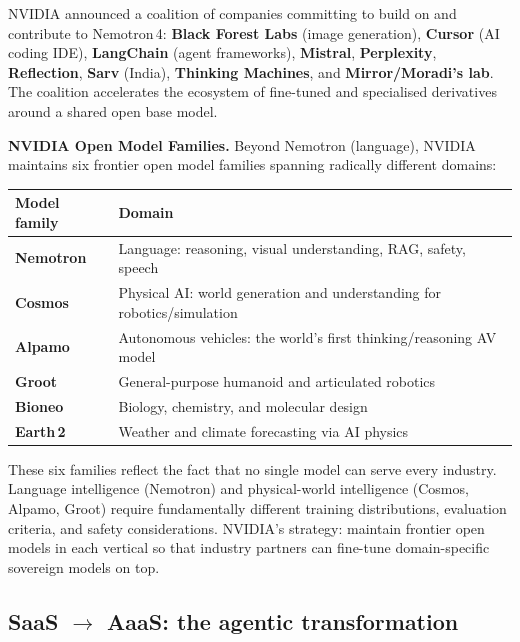 \begin{notebox}[title={Nemotron Coalition}]
  NVIDIA announced a coalition of companies committing to build on and contribute to
  Nemotron\,4: \textbf{Black Forest Labs} (image generation), \textbf{Cursor}
  (AI coding IDE), \textbf{LangChain} (agent frameworks), \textbf{Mistral},
  \textbf{Perplexity}, \textbf{Reflection}, \textbf{Sarv} (India), \textbf{Thinking
  Machines}, and \textbf{Mirror/Moradi's lab}. The coalition accelerates the ecosystem
  of fine-tuned and specialised derivatives around a shared open base model.
\end{notebox}

\textbf{NVIDIA Open Model Families.} Beyond Nemotron (language), NVIDIA maintains six
frontier open model families spanning radically different domains:

\begin{center}
\renewcommand{\arraystretch}{1.3}
\begin{tabular}{lp{8cm}}
\toprule
\textbf{Model family} & \textbf{Domain} \\
\midrule
\textbf{Nemotron} & Language: reasoning, visual understanding, RAG, safety, speech \\
\textbf{Cosmos} & Physical AI: world generation and understanding for robotics/simulation \\
\textbf{Alpamo} & Autonomous vehicles: the world's first thinking/reasoning AV model \\
\textbf{Groot} & General-purpose humanoid and articulated robotics \\
\textbf{Bioneo} & Biology, chemistry, and molecular design \\
\textbf{Earth\,2} & Weather and climate forecasting via AI physics \\
\bottomrule
\end{tabular}
\end{center}

\begin{intuitionbox}
  These six families reflect the fact that no single model can serve every industry.
  Language intelligence (Nemotron) and physical-world intelligence (Cosmos, Alpamo,
  Groot) require fundamentally different training distributions, evaluation criteria,
  and safety considerations. NVIDIA's strategy: maintain frontier open models in each
  vertical so that industry partners can fine-tune domain-specific sovereign models on
  top.
\end{intuitionbox}

\subsection{SaaS \texorpdfstring{$\to$}{→} AaaS: the agentic transformation}

